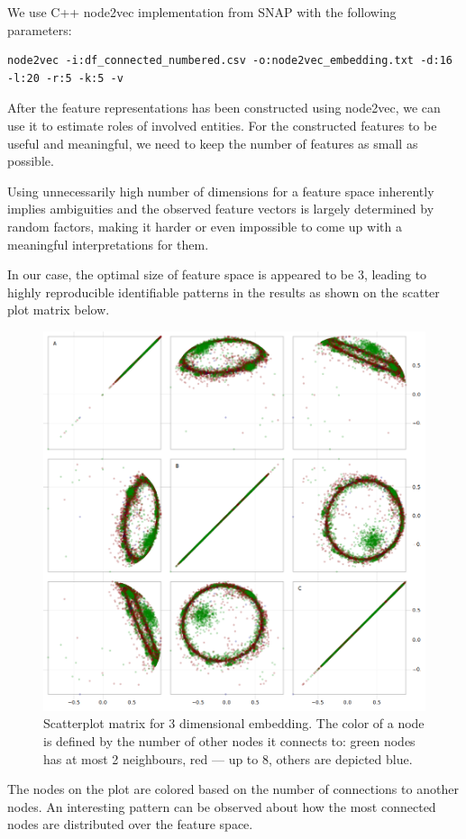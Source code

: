 We use C++ node2vec implementation from SNAP\cite{leskovec2016snap} with the following parameters:

\begin{lstlisting}
node2vec -i:df_connected_numbered.csv -o:node2vec_embedding.txt -d:16 -l:20 -r:5 -k:5 -v
\end{lstlisting}

After the feature representations has been constructed using node2vec, we can use it to estimate roles of involved entities. For the constructed features to be useful and meaningful, we need to keep the number of features as small as possible.

Using unnecessarily high number of dimensions for a feature space inherently implies ambiguities and the observed feature vectors is largely determined by random factors, making it harder or even impossible to come up with a meaningful interpretations for them.

In our case, the optimal size of feature space is appeared to be 3, leading to highly reproducible identifiable patterns in the results as shown on the scatter plot matrix below.

\begin{figure}[H]   \centering
    \includegraphics[width=0.7\linewidth]{plots/ScatterplotMatrix1.png}
    \caption{Scatterplot matrix for 3 dimensional embedding. The color of a node is defined by the number of other nodes it connects to: green nodes has at most 2 neighbours, red --- up to 8, others are depicted blue.}
    \label{fig:my_label}
\end{figure}

The nodes on the plot are colored based on the number of connections to another nodes. An interesting pattern can be observed about how the most connected nodes are distributed over the feature space.


